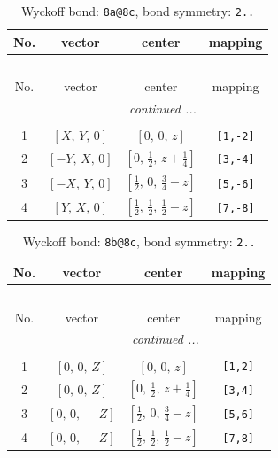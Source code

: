 \documentclass[fleqn,8pt]{jsarticle}
\begin{document}
\begin{longtable}{cccc}
\caption{Wyckoff bond: {\tt 8a@8c}, bond symmetry: {\tt 2..}}
 \\
 \hline \hline
No. & vector & center & mapping \\ \hline \endfirsthead

\multicolumn{3}{l}{\tablename\ \thetable{}} \\
 \hline \hline
No. & vector & center & mapping \\ \hline \endhead

 \hline \hline
\multicolumn{3}{r}{\footnotesize\it continued ...} \\ \endfoot

 \hline \hline
\multicolumn{3}{r}{} \\ \endlastfoot

1 & $\left[ X,\, Y,\, 0 \right]$ & $\left[ 0,\, 0,\, z \right]$ & {\tt [1,-2]} \\ \hline
2 & $\left[ - Y,\, X,\, 0 \right]$ & $\left[ 0,\, \frac{1}{2},\, z + \frac{1}{4} \right]$ & {\tt [3,-4]} \\ \hline
3 & $\left[ - X,\, Y,\, 0 \right]$ & $\left[ \frac{1}{2},\, 0,\, \frac{3}{4} - z \right]$ & {\tt [5,-6]} \\ \hline
4 & $\left[ Y,\, X,\, 0 \right]$ & $\left[ \frac{1}{2},\, \frac{1}{2},\, \frac{1}{2} - z \right]$ & {\tt [7,-8]} \\
\end{longtable}
\renewcommand{\arraystretch}{1.2}
\begin{longtable}{cccc}
\caption{Wyckoff bond: {\tt 8b@8c}, bond symmetry: {\tt 2..}}
 \\
 \hline \hline
No. & vector & center & mapping \\ \hline \endfirsthead

\multicolumn{3}{l}{\tablename\ \thetable{}} \\
 \hline \hline
No. & vector & center & mapping \\ \hline \endhead

 \hline \hline
\multicolumn{3}{r}{\footnotesize\it continued ...} \\ \endfoot

 \hline \hline
\multicolumn{3}{r}{} \\ \endlastfoot

1 & $\left[ 0,\, 0,\, Z \right]$ & $\left[ 0,\, 0,\, z \right]$ & {\tt [1,2]} \\ \hline
2 & $\left[ 0,\, 0,\, Z \right]$ & $\left[ 0,\, \frac{1}{2},\, z + \frac{1}{4} \right]$ & {\tt [3,4]} \\ \hline
3 & $\left[ 0,\, 0,\, - Z \right]$ & $\left[ \frac{1}{2},\, 0,\, \frac{3}{4} - z \right]$ & {\tt [5,6]} \\ \hline
4 & $\left[ 0,\, 0,\, - Z \right]$ & $\left[ \frac{1}{2},\, \frac{1}{2},\, \frac{1}{2} - z \right]$ & {\tt [7,8]} \\
\end{longtable}
\end{document}
